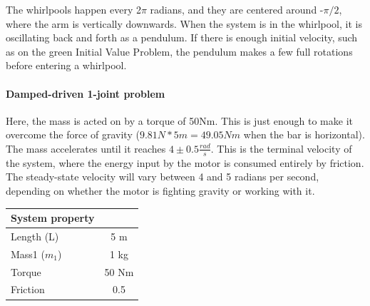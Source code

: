 \documentclass{article}
\begin{document}
\centering The whirlpools happen every 2$\pi$ radians, and they are centered around -$\pi/2$, where the arm is vertically downwards. When the system is in the whirlpool, it is oscillating back and forth as a pendulum. If there is enough initial velocity, such as on the green Initial Value Problem, the pendulum makes a few full rotations before entering a whirlpool.

\begin{center}
%
\label{labelname}%
\end{center}

\newpage

\paragraph{Damped-driven 1-joint problem}
Here, the mass is acted on by a torque of 50Nm. This is just enough to make it overcome the force of gravity ($9.81N * 5m = 49.05Nm$ when the bar is horizontal). The mass accelerates until it reaches $4\pm0.5\frac{rad}{s}$. This is the terminal velocity of the system, where the energy input by the motor is consumed entirely by friction. The steady-state velocity will vary between 4 and 5 radians per second, depending on whether the motor is fighting gravity or working with it. 
\begin{table}[h]
\centering
\begin{tabular}{|l|c|}
\hline
System property & \\
\hline
Length (L) & 5 m \\
Mass1 ($m_1$) & 1 kg \\
Torque & 50 Nm \\
Friction & 0.5 \\ %
\hline
\end{tabular}
\label{tab:quantities}
\end{table}
\end{document}
